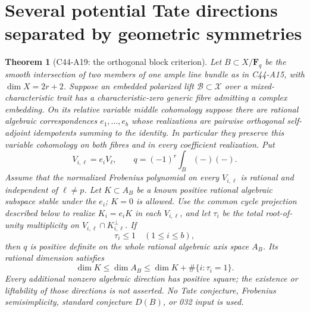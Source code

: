 \documentclass[11pt]{article}
\newtheorem{theorem}{Theorem}[section]
\theoremstyle{remark}\newtheorem{remark}[theorem]{Remark}
\begin{document}

\section{Several potential Tate directions separated by geometric symmetries}
\label{sec:c44-a19}

\begin{theorem}[C44-A19: the orthogonal block criterion]
Let $B\subset X/\mathbf F_q$ be the smooth intersection of two
members of one ample line bundle as in C44-A15, with
$\dim X=2r+2$. Suppose an embedded polarized lift
$\mathcal B\subset\mathcal X$ over a mixed-characteristic trait
has a characteristic-zero generic fibre admitting a complex
embedding. On its relative variable middle cohomology suppose
there are rational algebraic correspondences $e_1,\ldots,e_b$
whose realizations are pairwise orthogonal self-adjoint
idempotents summing to the identity. In particular they
preserve this variable cohomology on both fibres and in every
coefficient realization. Put
\[
 V_{i,\ell}=e_iV_\ell,\qquad
          q=(-1)^r\int_B(-)(-).
 \tag{A19.1}
\]
Assume that the normalized Frobenius polynomial on every
$V_{i,\ell}$ is rational and independent of $\ell\ne p$.
Let $K\subset A_B$ be a known positive rational algebraic
subspace stable under the $e_i$; $K=0$ is allowed. Use the
common cycle projection described below to realize
$K_i=e_iK$ in each $V_{i,\ell}$, and let $\tau_i$ be the total
root-of-unity multiplicity on $V_{i,\ell}\cap K_{i,\ell}^\perp$.
If
\[
                            \tau_i\leq1\quad(1\leq i\leq b),
 \tag{A19.2}
\]
then $q$ is positive definite on the whole rational algebraic
axis space $A_B$. Its rational dimension satisfies
\[
     \dim K\leq\dim A_B\leq\dim K+
                              \#\{i:\tau_i=1\}.
 \tag{A19.3}
\]
Every additional nonzero algebraic direction has positive
square; the existence or liftability of those directions is
not asserted. No Tate conjecture, Frobenius semisimplicity,
standard conjecture $D(B)$, or 032 input is used.
\end{theorem}
\end{document}
